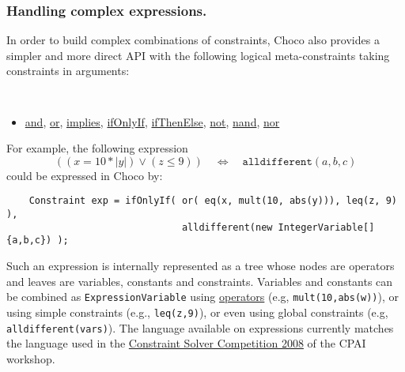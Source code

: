 \subsubsection{Handling complex expressions.}\label{model:handlingcomplexexpressions}\hypertarget{model:handlingcomplexexpressions}{}
In order to build complex combinations of constraints, Choco also provides a simpler and more direct API with the following logical meta-constraints taking constraints in arguments:
\begin{notedef}\tt
  \begin{itemize}
  \item \hyperlink{and:andconstraint}{and}, \hyperlink{or:orconstraint}{or}, \hyperlink{implies:impliesconstraint}{implies}, \hyperlink{ifonlyif:ifonlyifconstraint}{ifOnlyIf}, \hyperlink{ifthenelse:ifthenelseconstraint}{ifThenElse}, \hyperlink{not:notconstraint}{not}, \hyperlink{nand:nandconstraint}{nand}, \hyperlink{nor:norconstraint}{nor}
  \end{itemize}
\end{notedef}
For example, the following expression
$$((x = 10 * |y|) \lor (z \le 9))\quad \iff\quad \texttt{alldifferent}(a,b,c)$$
could be expressed in Choco by:
\begin{lstlisting}
	Constraint exp = ifOnlyIf( or( eq(x, mult(10, abs(y))), leq(z, 9) ), 
                               alldifferent(new IntegerVariable[]{a,b,c}) );
\end{lstlisting}
Such an expression is internally represented as a tree whose nodes are operators and leaves are variables, constants and constraints. Variables and constants can be combined as \texttt{ExpressionVariable} using \hyperlink{model:expressionvariables}{operators} (e.g, \texttt{mult(10,abs(w))}), or using simple constraints (e.g., \texttt{leq(z,9)}), or even using global constraints (e.g, \texttt{alldifferent(vars)}).
The language available on expressions currently matches the language used in the \href{http://cpai.ucc.ie/08/}{Constraint Solver Competition 2008} of the CPAI workshop.

